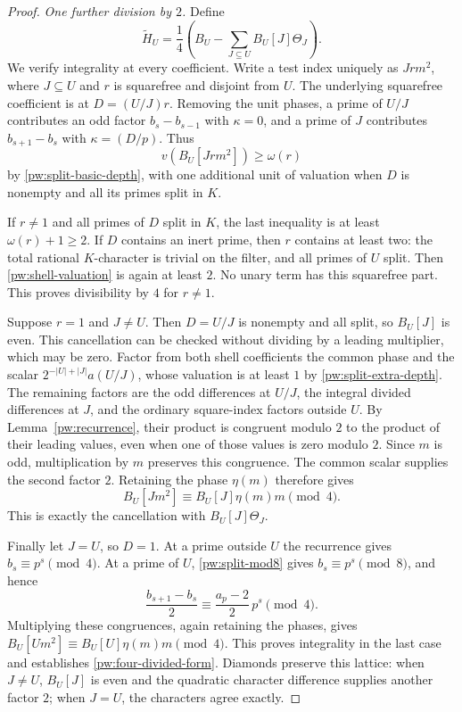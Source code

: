\begin{proof}
\smallskip\noindent\emph{One further division by $2$.}
Define
\begin{equation}\label{pw:four-divided-form}
 \widetilde H_U=\frac14
 \left(B_U-\sum_{J\subseteq U}B_U[J]\Theta_J\right).
\end{equation}
We verify integrality at every coefficient.  Write a test index uniquely
as $Jrm^2$, where $J\subseteq U$ and $r$ is squarefree and disjoint from
$U$.  The underlying squarefree coefficient is at
$D=(U/J)r$.  Removing the unit phases, a prime of $U/J$ contributes an odd
factor $b_s-b_{s-1}$ with $\kappa=0$, and a prime of $J$ contributes
$b_{s+1}-b_s$ with $\kappa=(D/p)$.  Thus
\begin{equation}\label{pw:shell-valuation}
 v(B_U[Jrm^2])\ge\omega(r)
\end{equation}
by \eqref{pw:split-basic-depth}, with one additional unit of valuation
when $D$ is nonempty and all its primes split in $K$.

If $r\ne1$ and all primes of $D$ split in $K$, the last inequality is
at least $\omega(r)+1\ge2$.  If $D$ contains an inert prime, then $r$
contains at least two: the total rational $K$-character is trivial on
the filter, and all primes of $U$ split.  Then
\eqref{pw:shell-valuation} is again at least $2$.  No unary term has
this squarefree part.  This proves divisibility by $4$ for $r\ne1$.

Suppose $r=1$ and $J\ne U$.  Then $D=U/J$ is nonempty and all split,
so $B_U[J]$ is even.  This cancellation can be checked without dividing
by a leading multiplier, which may be zero.  Factor from both shell
coefficients the common phase and the scalar
$2^{-|U|+|J|}a(U/J)$, whose valuation is at least $1$ by
\eqref{pw:split-extra-depth}.  The remaining factors are the odd
differences at $U/J$, the integral divided differences at $J$, and
the ordinary square-index factors outside $U$.  By
Lemma~\ref{pw:recurrence}, their product is congruent modulo $2$ to
the product of their leading values, even when one of those values
is zero modulo $2$.  Since $m$ is odd, multiplication by $m$ preserves
this congruence.  The common scalar supplies the second factor $2$.
Retaining the phase $\eta(m)$ therefore gives
\[
 B_U[Jm^2]\equiv B_U[J]\eta(m)m\pmod4.
\]
This is exactly the cancellation with $B_U[J]\Theta_J$.

Finally let $J=U$, so $D=1$.  At a prime outside $U$ the recurrence gives
$b_s\equiv p^s\pmod4$.  At a prime of $U$,
\eqref{pw:split-mod8} gives $b_s\equiv p^s\pmod8$, and hence
\[
 \frac{b_{s+1}-b_s}{2}
 \equiv \frac{a_p-2}{2}\,p^s\pmod4.
\]
Multiplying these congruences, again retaining the phases, gives
$B_U[Um^2]\equiv B_U[U]\eta(m)m\pmod4$.  This proves integrality in
the last case and establishes \eqref{pw:four-divided-form}.
Diamonds preserve this lattice: when $J\ne U$, $B_U[J]$ is even and
the quadratic character difference supplies another factor $2$; when
$J=U$, the characters agree exactly.


\end{proof}
